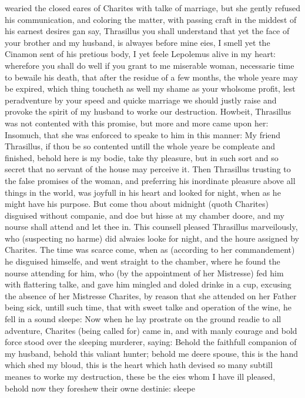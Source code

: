 wearied the closed eares of Charites with talke of marriage, but she gently
refused his communication, and coloring the matter, with passing craft in the
middest of his earnest desires gan say, Thrasillus you shall understand that
yet the face of your brother and my husband, is alwayes before mine eies, I
smell yet the Cinamon sent of his pretious body, I yet feele Lepolemus alive in
my heart: wherefore you shall do well if you grant to me miserable woman,
necessarie time to bewaile his death, that after the residue of a few months,
the whole yeare may be expired, which thing toucheth as well my shame as your
wholsome profit, lest peradventure by your speed and quicke marriage we should
justly raise and provoke the spirit of my husband to worke our destruction.
Howbeit, Thrasillus was not contented with this promise, but more and more came
upon her: Insomuch, that she was enforced to speake to him in this manner: My
friend Thrasillus, if thou be so contented untill the whole yeare be compleate
and finished, behold here is my bodie, take thy pleasure, but in such sort and
so secret that no servant of the house may perceive it. Then Thrasillus
trusting to the false promises of the woman, and preferring his inordinate
pleasure above all things in the world, was joyfull in his heart and looked for
night, when as he might have his purpose. But come thou about midnight (quoth
Charites) disguised without companie, and doe but hisse at my chamber doore,
and my nourse shall attend and let thee in. This counsell pleased Thrasillus
marveilously, who (suspecting no harme) did alwaies looke for night, and the
houre assigned by Charites. The time was scarce come, when as (according to her
commandement) he disguised himselfe, and went straight to the chamber, where he
found the nourse attending for him, who (by the appointment of her Mistresse)
fed him with flattering talke, and gave him mingled and doled drinke in a cup,
excusing the absence of her Mistresse Charites, by reason that she attended on
her Father being sick, untill such time, that with sweet talke and operation of
the wine, he fell in a sound sleepe: Now when he lay prostrate on the ground
readie to all adventure, Charites (being called for) came in, and with manly
courage and bold force stood over the sleeping murderer, saying: Behold the
faithfull companion of my husband, behold this valiant hunter; behold me deere
spouse, this is the hand which shed my bloud, this is the heart which hath
devised so many subtill meanes to worke my destruction, these be the eies whom
I have ill pleased, behold now they foreshew their owne destinie: sleepe
